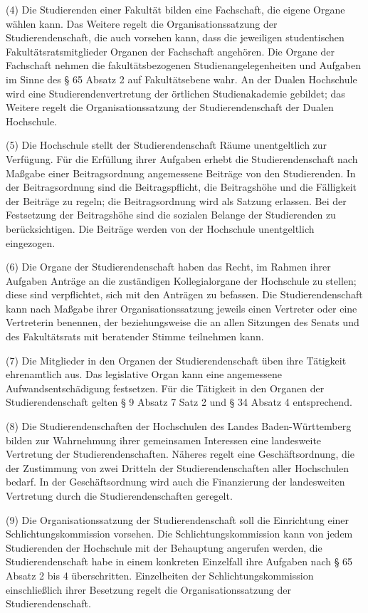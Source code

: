 \documentclass[
10pt,
a4paper,
twoside,								%
titlepage=false,							%
draft=false								%
]{scrartcl}
\begin{document}
(4) Die Studierenden einer Fakultät bilden eine  Fachschaft, die eigene Organe wählen kann. Das Weitere regelt die  Organisationssatzung der Studierendenschaft, die auch vorsehen kann,  dass die jeweiligen studentischen Fakultätsratsmitglieder Organen der  Fachschaft angehören. Die Organe der Fachschaft nehmen die  fakultätsbezogenen Studienangelegenheiten und Aufgaben im Sinne des § 65  Absatz 2 auf Fakultätsebene wahr. An der Dualen Hochschule wird eine  Studierendenvertretung der örtlichen Studienakademie gebildet; das  Weitere regelt die Organisationssatzung der Studierendenschaft der  Dualen Hochschule.

(5) Die Hochschule stellt der  Studierendenschaft Räume unentgeltlich zur Verfügung. Für die Erfüllung  ihrer Aufgaben erhebt die Studierendenschaft nach Maßgabe einer  Beitragsordnung angemessene Beiträge von den Studierenden. In der  Beitragsordnung sind die Beitragspflicht, die Beitragshöhe und die  Fälligkeit der Beiträge zu regeln; die Beitragsordnung wird als Satzung  erlassen. Bei der Festsetzung der Beitragshöhe sind die sozialen Belange  der Studierenden zu berücksichtigen. Die Beiträge werden von der  Hochschule unentgeltlich eingezogen.

(6) Die Organe der Studierendenschaft haben das  Recht, im Rahmen ihrer Aufgaben Anträge an die zuständigen  Kollegialorgane der Hochschule zu stellen; diese sind verpflichtet, sich  mit den Anträgen zu befassen. Die Studierendenschaft kann nach Maßgabe  ihrer Organisationssatzung jeweils einen Vertreter oder eine Vertreterin  benennen, der beziehungsweise die an allen Sitzungen des Senats und des  Fakultätsrats mit beratender Stimme teilnehmen kann.

(7) Die Mitglieder in den Organen der  Studierendenschaft üben ihre Tätigkeit ehrenamtlich aus. Das legislative  Organ kann eine angemessene Aufwandsentschädigung festsetzen. Für die  Tätigkeit in den Organen der Studierendenschaft gelten § 9 Absatz 7 Satz  2 und § 34 Absatz 4 entsprechend.

(8) Die Studierendenschaften der Hochschulen  des Landes Baden-Württemberg bilden zur Wahrnehmung ihrer gemeinsamen  Interessen eine landesweite Vertretung der Studierendenschaften. Näheres  regelt eine Geschäftsordnung, die der Zustimmung von zwei Dritteln der  Studierendenschaften aller Hochschulen bedarf. In der Geschäftsordnung  wird auch die Finanzierung der landesweiten Vertretung durch die  Studierendenschaften geregelt.

(9) Die Organisationssatzung der  Studierendenschaft soll die Einrichtung einer Schlichtungskommission  vorsehen. Die Schlichtungskommission kann von jedem Studierenden der  Hochschule mit der Behauptung angerufen werden, die Studierendenschaft  habe in einem konkreten Einzelfall ihre Aufgaben nach § 65 Absatz 2 bis 4  überschritten. Einzelheiten der Schlichtungskommission einschließlich  ihrer Besetzung regelt die Organisationssatzung der Studierendenschaft.
\end{document}
